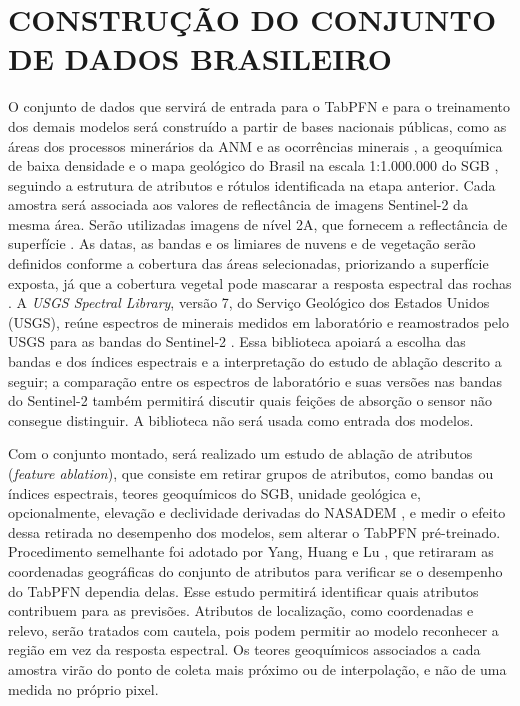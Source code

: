 \section{CONSTRUÇÃO DO CONJUNTO DE DADOS BRASILEIRO}

O conjunto de dados que servirá de entrada para o TabPFN e para o treinamento dos demais modelos será construído a partir de bases nacionais públicas, como as áreas dos processos minerários da ANM \cite{anm2026sigmine} e as ocorrências minerais \cite{sgb2026ocorrencias}, a geoquímica de baixa densidade \cite{sgb2026geoquimica} e o mapa geológico do Brasil na escala 1:1.000.000 do SGB \cite{sgb2026geologia}, seguindo a estrutura de atributos e rótulos identificada na etapa anterior. Cada amostra será associada aos valores de reflectância de imagens Sentinel-2 da mesma área. Serão utilizadas imagens de nível 2A, que fornecem a reflectância de superfície \cite{esa2026b}. As datas, as bandas e os limiares de nuvens e de vegetação serão definidos conforme a cobertura das áreas selecionadas, priorizando a superfície exposta, já que a cobertura vegetal pode mascarar a resposta espectral das rochas \cite{grebby2011}. A \textit{USGS Spectral Library}, versão 7, do Serviço Geológico dos Estados Unidos (USGS), reúne espectros de minerais medidos em laboratório e reamostrados pelo USGS para as bandas do Sentinel-2 \cite{kokaly2017}. Essa biblioteca apoiará a escolha das bandas e dos índices espectrais e a interpretação do estudo de ablação descrito a seguir; a comparação entre os espectros de laboratório e suas versões nas bandas do Sentinel-2 também permitirá discutir quais feições de absorção o sensor não consegue distinguir. A biblioteca não será usada como entrada dos modelos.

Com o conjunto montado, será realizado um estudo de ablação de atributos (\textit{feature ablation}), que consiste em retirar grupos de atributos, como bandas ou índices espectrais, teores geoquímicos do SGB, unidade geológica e, opcionalmente, elevação e declividade derivadas do NASADEM \cite{nasajpl2020}, e medir o efeito dessa retirada no desempenho dos modelos, sem alterar o TabPFN pré-treinado. Procedimento semelhante foi adotado por Yang, Huang e Lu \cite{yang2026}, que retiraram as coordenadas geográficas do conjunto de atributos para verificar se o desempenho do TabPFN dependia delas. Esse estudo permitirá identificar quais atributos contribuem para as previsões. Atributos de localização, como coordenadas e relevo, serão tratados com cautela, pois podem permitir ao modelo reconhecer a região em vez da resposta espectral. Os teores geoquímicos associados a cada amostra virão do ponto de coleta mais próximo ou de interpolação, e não de uma medida no próprio pixel.

